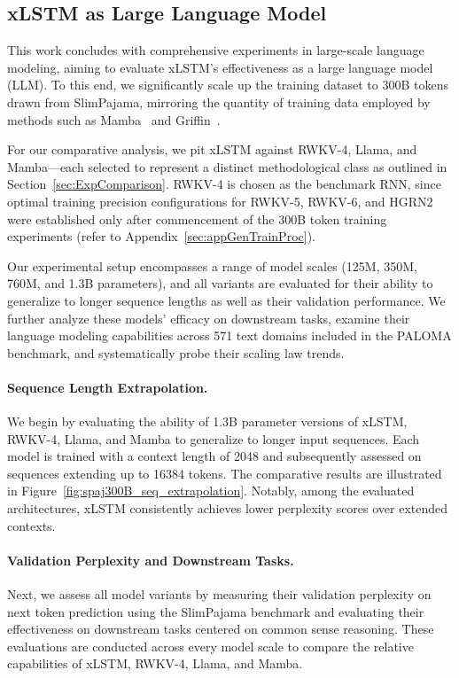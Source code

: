 \subsection{xLSTM as Large Language Model}
\label{sec:ExpLanguage}

This work concludes with comprehensive experiments in large-scale language modeling, aiming to evaluate xLSTM's effectiveness as a large language model (LLM). To this end, we significantly scale up the training dataset to 300B tokens drawn from SlimPajama, mirroring the quantity of training data employed by methods such as Mamba~\citep{Gu:24arxiv} and Griffin~\citep{De:24arxiv}.

For our comparative analysis, we pit xLSTM against RWKV-4, Llama, and Mamba—each selected to represent a distinct methodological class as outlined in Section~\ref{sec:ExpComparison}. RWKV-4 is chosen as the benchmark RNN, since optimal training precision configurations for RWKV-5, RWKV-6, and HGRN2 were established only after commencement of the 300B token training experiments (refer to Appendix~\ref{sec:appGenTrainProc}).

Our experimental setup encompasses a range of model scales (125M, 350M, 760M, and 1.3B parameters), and all variants are evaluated for their ability to generalize to longer sequence lengths as well as their validation performance. We further analyze these models' efficacy on downstream tasks, examine their language modeling capabilities across 571 text domains included in the PALOMA benchmark, and systematically probe their scaling law trends.

\paragraph{Sequence Length Extrapolation.}
\label{sec:spaj300B_ctx_extrapolation}
We begin by evaluating the ability of 1.3B parameter versions of xLSTM, RWKV-4, Llama, and Mamba to generalize to longer input sequences. Each model is trained with a context length of 2048 and subsequently assessed on sequences extending up to 16384 tokens. The comparative results are illustrated in Figure~\ref{fig:spaj300B_seq_extrapolation}. Notably, among the evaluated architectures, xLSTM consistently achieves lower perplexity scores over extended contexts.

\paragraph{Validation Perplexity and Downstream Tasks.}
\label{sec:spaj_downstream_eval}
Next, we assess all model variants by measuring their validation perplexity on next token prediction using the SlimPajama benchmark and evaluating their effectiveness on downstream tasks centered on common sense reasoning. These evaluations are conducted across every model scale to compare the relative capabilities of xLSTM, RWKV-4, Llama, and Mamba.

